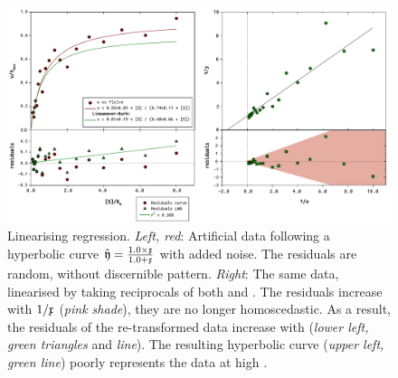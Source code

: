 \begin{refsection}
\begin{figure}
 \caption{Linearising regression. \emph{Left, red}: Artificial data following a hyperbolic curve \(\hat{\mathfrak{y}} = \frac{1.0 \times \mathfrak{x}}{1.0 + \mathfrak{x}} \) with added noise. The residuals are random, without discernible pattern. \emph{Right}: The same data, linearised by taking reciprocals of both  and . The residuals increase with \(1/\mathfrak{x} \) (\emph{pink shade}), they are no longer homoscedastic. As a result, the residuals of the re-transformed data increase with  (\emph{lower left, green triangles} and \emph{line}). The resulting hyperbolic curve (\emph{upper left, green line}) poorly represents the data at high .}
 \label{fig:LinReg}
 \centering
 \includegraphics[width=\textwidth]{Graphics/LinearisingRegression}
\end{figure}


\end{refsection}

